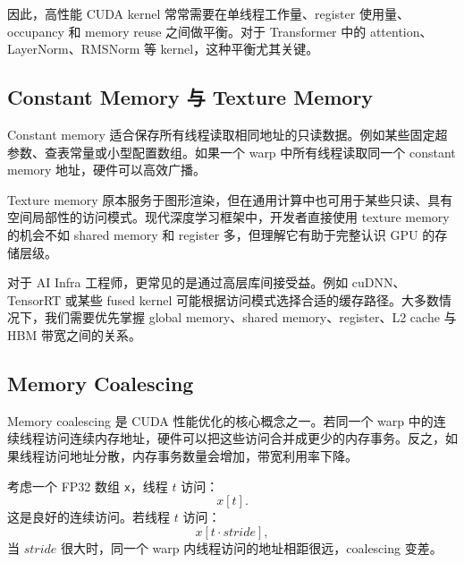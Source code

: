 因此，高性能 CUDA kernel 常常需要在单线程工作量、register 使用量、occupancy 和 memory reuse 之间做平衡。对于 Transformer 中的 attention、LayerNorm、RMSNorm 等 kernel，这种平衡尤其关键。

\subsection{Constant Memory 与 Texture Memory}
\label{subsec:constant-texture-memory}

Constant memory 适合保存所有线程读取相同地址的只读数据。例如某些固定超参数、查表常量或小型配置数组。如果一个 warp 中所有线程读取同一个 constant memory 地址，硬件可以高效广播。

Texture memory 原本服务于图形渲染，但在通用计算中也可用于某些只读、具有空间局部性的访问模式。现代深度学习框架中，开发者直接使用 texture memory 的机会不如 shared memory 和 register 多，但理解它有助于完整认识 GPU 的存储层级。

对于 AI Infra 工程师，更常见的是通过高层库间接受益。例如 cuDNN、TensorRT 或某些 fused kernel 可能根据访问模式选择合适的缓存路径。大多数情况下，我们需要优先掌握 global memory、shared memory、register、L2 cache 与 HBM 带宽之间的关系。

\subsection{Memory Coalescing}
\label{subsec:memory-coalescing}

Memory coalescing 是 CUDA 性能优化的核心概念之一。若同一个 warp 中的连续线程访问连续内存地址，硬件可以把这些访问合并成更少的内存事务。反之，如果线程访问地址分散，内存事务数量会增加，带宽利用率下降。

考虑一个 FP32 数组 \texttt{x}，线程 $t$ 访问：
\[
  x[t].
\]
这是良好的连续访问。若线程 $t$ 访问：
\[
  x[t\cdot stride],
\]
当 $stride$ 很大时，同一个 warp 内线程访问的地址相距很远，coalescing 变差。

